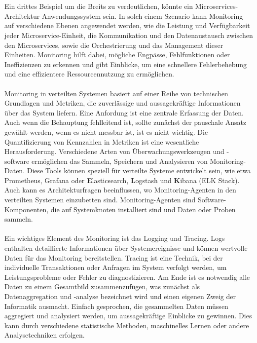 \\\\
Ein drittes Beispiel um die Breits zu verdeutlichen, könnte ein Microservices-Architektur Anwendungssystem sein. In solch einem Szenario kann Monitoring auf verschiedene Ebenen angewendet werden, wie die Leistung und Verfügbarkeit jeder Microservice-Einheit, die Kommunikation und den Datenaustausch zwischen den Microservices, sowie die Orchestrierung und das Management dieser Einheiten. Monitoring hilft dabei, mögliche Engpässe, Fehlfunktionen oder Ineffizienzen zu erkennen und gibt Einblicke, um eine schnellere Fehlerbehebung und eine effizientere Ressourcennutzung zu ermöglichen.
\\\\
Monitoring in verteilten Systemen basiert auf einer Reihe von technischen Grundlagen und Metriken, die zuverlässige und aussagekräftige Informationen über das System liefern. Eine Anfordung ist eine zentrale Erfassung der Daten. Auch wenn die Behauptung fehlleitend ist, sollte zunächst der pauschale Ansatz gewählt werden, wenn es nicht messbar ist, ist es nicht wichtig. Die Quantifizierung von Kennzahlen in Metriken ist eine wesentliche Herausforderung. Verschiedene Arten von Überwachungswerkzeugen und -software ermöglichen das Sammeln, Speichern und Analysieren von Monitoring-Daten. Diese Tools können speziell für verteilte Systeme entwickelt sein, wie etwa Prometheus, Grafana oder \textbf{E}lasticsearch, \textbf{L}ogstash und \textbf{K}ibana (ELK Stack).
Auch kann es Architekturfragen beeinflussen, wo Monitoring-Agenten in den verteilten Systemen einzubetten sind. Monitoring-Agenten sind Software-Komponenten, die auf Systemknoten installiert sind und Daten  oder Proben sammeln. 
\\\\
Ein wichtiges Element des Monitoring ist das Logging und Tracing. Logs enthalten detaillierte Informationen über Systemereignisse und können wertvolle Daten für das Monitoring bereitstellen. Tracing ist eine Technik, bei der individuelle Transaktionen oder Anfragen im System verfolgt werden, um Leistungsprobleme oder Fehler zu diagnostizieren.
Am Ende ist es notwendig alle Daten zu einem Gesamtbild zusammenzufügen, was zunächst als Datenaggregation und -analyse bezeichnet wird und einen eigenen Zweig der Informatik ausmacht. Einfach gesprochen, die gesammelten Daten müssen aggregiert und analysiert werden, um aussagekräftige Einblicke zu gewinnen. Dies kann durch verschiedene statistische Methoden, maschinelles Lernen oder andere Analysetechniken erfolgen.
